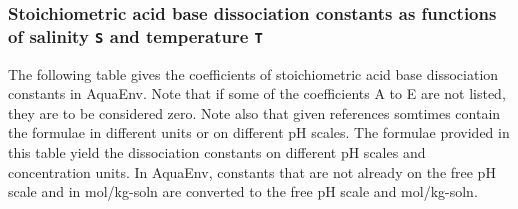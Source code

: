 \documentclass[a4paper]{article}
\begin{document}
\subsubsection{Stoichiometric acid base dissociation constants as functions of salinity \texttt{S} and temperature \texttt{T}}
The following table gives the coefficients of stoichiometric acid base dissociation constants in \textsf{AquaEnv}.  Note that if some of the coefficients A to E are not listed, they are to be considered zero. Note also that given references somtimes contain the formulae in different units or on different pH scales. The formulae provided in this table yield the dissociation constants on different pH scales and concentration units. In \textsf{AquaEnv}, constants that are not already on the free pH scale and in mol/kg-soln are converted to the free pH scale and mol/kg-soln.

\end{document}
